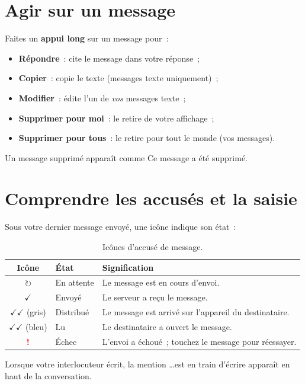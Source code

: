 \documentclass[11pt,a4paper,oneside]{report}
\newcommand{\bouton}[1]{\textbf{\textsf{#1}}}
\newcommand{\champ}[1]{\og{}#1\fg{}}
\newcommand{\thd}[1]{\textbf{\textcolor{AlanyaIndigoDark}{#1}}}
\begin{document}
\section{Agir sur un message}
Faites un \textbf{appui long} sur un message pour~:
\begin{itemize}[leftmargin=1.3em]
  \item \bouton{R\'{e}pondre}~: cite le message dans votre r\'{e}ponse~;
  \item \bouton{Copier}~: copie le texte (messages texte uniquement)~;
  \item \bouton{Modifier}~: \'{e}dite l'un de \emph{vos} messages texte~;
  \item \bouton{Supprimer pour moi}~: le retire de votre affichage~;
  \item \bouton{Supprimer pour tous}~: le retire pour tout le monde (vos messages).
\end{itemize}
Un message supprim\'{e} appara\^{i}t comme \champ{Ce message a \'{e}t\'{e} supprim\'{e}}.

\section{Comprendre les accus\'{e}s et la saisie}
Sous votre dernier message envoy\'{e}, une ic\^{o}ne indique son \'{e}tat~:
\begin{table}[H]
\centering\small
\begin{tabularx}{\linewidth}{@{}c l X@{}}
\toprule
\thd{Ic\^{o}ne} & \thd{\'{E}tat} & \thd{Signification}\\
\midrule
\textcolor{AlanyaGray}{$\circlearrowright$} & En attente & Le message est en cours d'envoi.\\
$\checkmark$ & Envoy\'{e} & Le serveur a re\c{c}u le message.\\
$\checkmark\checkmark$ \textcolor{AlanyaGray}{(gris)} & Distribu\'{e} & Le message est arriv\'{e} sur l'appareil du destinataire.\\
$\checkmark\checkmark$ \textcolor{AlanyaBlue}{(bleu)} & Lu & Le destinataire a ouvert le message.\\
\textcolor{red}{\textbf{!}} & \'{E}chec & L'envoi a \'{e}chou\'{e}~; touchez le message pour r\'{e}essayer.\\
\bottomrule
\end{tabularx}
\caption{Ic\^{o}nes d'accus\'{e} de message.}
\label{tab:accuses}
\end{table}
Lorsque votre interlocuteur \'{e}crit, la mention \champ{\ldots est en train d'\'{e}crire}
appara\^{i}t en haut de la conversation.
\end{document}
